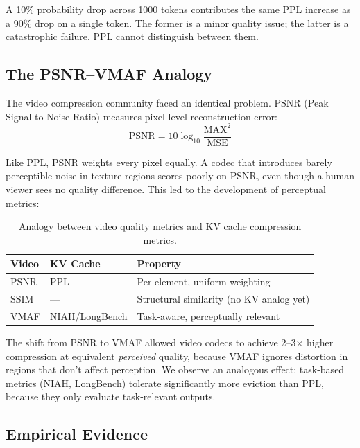 A 10\% probability drop across 1000 tokens contributes the same PPL increase as a 90\% drop on a single token. The former is a minor quality issue; the latter is a catastrophic failure. PPL cannot distinguish between them.

\subsection{The PSNR--VMAF Analogy}

The video compression community faced an identical problem. PSNR (Peak Signal-to-Noise Ratio) measures pixel-level reconstruction error:
\begin{equation}
    \text{PSNR} = 10 \log_{10}\frac{\text{MAX}^2}{\text{MSE}}
\end{equation}

Like PPL, PSNR weights every pixel equally. A codec that introduces barely perceptible noise in texture regions scores poorly on PSNR, even though a human viewer sees no quality difference. This led to the development of perceptual metrics:

\begin{table}[h]
\centering
\begin{tabular}{lll}
\toprule
\textbf{Video} & \textbf{KV Cache} & \textbf{Property} \\
\midrule
PSNR & PPL & Per-element, uniform weighting \\
SSIM & --- & Structural similarity (no KV analog yet) \\
VMAF & NIAH/LongBench & Task-aware, perceptually relevant \\
\bottomrule
\end{tabular}
\caption{Analogy between video quality metrics and KV cache compression metrics.}
\label{tab:metric-analogy}
\end{table}

The shift from PSNR to VMAF allowed video codecs to achieve 2--3$\times$ higher compression at equivalent \emph{perceived} quality, because VMAF ignores distortion in regions that don't affect perception. We observe an analogous effect: task-based metrics (NIAH, LongBench) tolerate significantly more eviction than PPL, because they only evaluate task-relevant outputs.

\subsection{Empirical Evidence}

